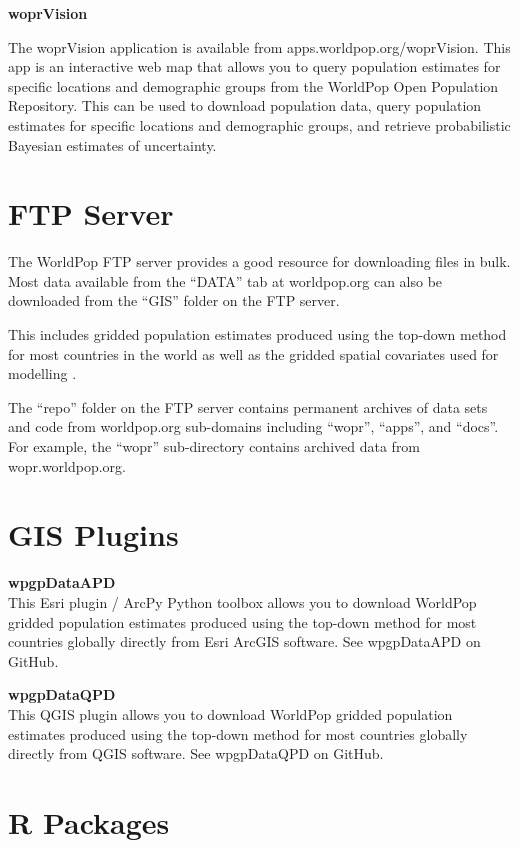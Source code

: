 \documentclass[]{book}
\begin{document}
\textbf{woprVision}

The woprVision application \citep{leasure2020wopr} is available from
apps.worldpop.org/woprVision. This app is an interactive web map that
allows you to query population estimates for specific locations and
demographic groups from the WorldPop Open Population Repository. This
can be used to download population data, query population estimates for
specific locations and demographic groups, and retrieve probabilistic
Bayesian estimates of uncertainty.

\section{FTP Server}\label{ftp-server}

The WorldPop FTP server provides a good resource for downloading files
in bulk. Most data available from the ``DATA'' tab at worldpop.org can
also be downloaded from the ``GIS'' folder on the FTP server.

This includes gridded population estimates produced using the top-down
method for most countries in the world as well as the gridded spatial
covariates used for modelling \citeyearpar[WorldPop et
al.][]{worldpop2018global}.

The ``repo'' folder on the FTP server contains permanent archives of
data sets and code from worldpop.org sub-domains including ``wopr'',
``apps'', and ``docs''. For example, the ``wopr'' sub-directory contains
archived data from wopr.worldpop.org.

\section{GIS Plugins}\label{gis-plugins}

\textbf{wpgpDataAPD}\\
This Esri plugin / ArcPy Python toolbox allows you to download WorldPop
gridded population estimates produced using the top-down method for most
countries globally \citeyearpar[WorldPop et al][]{worldpop2018global}
directly from Esri ArcGIS software. See wpgpDataAPD on GitHub.

\textbf{wpgpDataQPD}\\
This QGIS plugin allows you to download WorldPop gridded population
estimates produced using the top-down method for most countries globally
\citeyearpar[WorldPop et al][]{worldpop2018global} directly from QGIS
software. See wpgpDataQPD on GitHub.

\section{R Packages}\label{r-packages}
\end{document}
